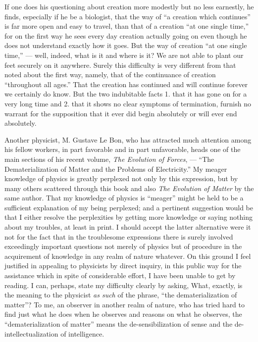 \documentclass[a4paper, 11pt, oneside, polutonikogreek, english, landscape]{article}
\begin{document}
If one does his questioning about creation more modestly but no less earnestly, he finds, especially if he be a biologist, that the way of ``a creation which continues'' is far more open and easy to travel, than that of a creation ``at one single time,'' for on the first way he sees every day creation actually going on even though he does not understand exactly how it goes. But the way of creation ``at one single time,'' --- well, indeed, what is it and where is it? We are not able to plant our feet securely on it anywhere. Surely this difficulty is very different from that noted about the first way, namely, that of the continuance of creation ``throughout all ages.'' That the creation has continued and will continue forever we certainly do know. But the two indubitable facts 1. that it has gone on for a very long time and 2. that it shows no clear symptoms of termination, furnish no warrant for the supposition that it ever did begin absolutely or will ever end absolutely.

Another physicist, M. Gustave Le Bon, who has attracted much attention among his fellow workers, in part favorable and in part unfavorable, heads one of the main sections of his recent volume, \emph{The Evolution of Forces}, --- ``The Dematerialization of Matter and the Problems of Electricity.'' My meager knowledge of physics is greatly perplexed not only by this expression, but by many others scattered through this book and also \emph{The Evolution of Matter} by the same author. That my knowledge of physics is ``meager'' might be held to be a sufficient explanation of my being perplexed; and a pertinent suggestion would be that I either resolve the perplexities by getting more knowledge or saying nothing about my troubles, at least in print. I should accept the latter alternative were it not for the fact that in the troublesome expressions there is surely involved exceedingly important questions not merely of physics but of procedure in the acquirement of knowledge in any realm of nature whatever. On this ground I feel justified in appealing to physicists by direct inquiry, in this public way for the assistance which in spite of considerable effort, I have been unable to get by reading. I can, perhaps, state my difficulty clearly by asking, What, exactly, is the meaning to the physicist \emph{as such} of the phrase, ``the dematerialization of matter''? To me, an observer in another realm of nature, who has tried hard to find just what he does when he observes and reasons on what he observes, the ``dematerialization of matter'' means the de-sensibilization of sense and the de-intellectualization of intelligence.
\end{document}
